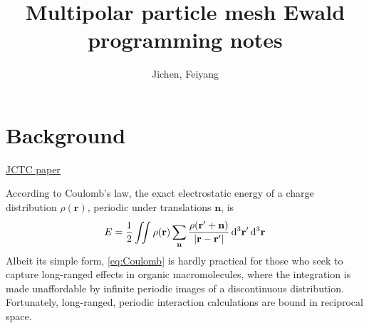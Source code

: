 \documentclass[12pt]{extarticle}
\title{Multipolar particle mesh Ewald programming notes}
\author{Jichen, Feiyang}
\renewcommand{\bf}{\mathbf}
\begin{document}
    \maketitle
    \section{Background}
    \href{https://pubs.acs.org/doi/pdf/10.1021/ct5007983}{JCTC paper}
    
    According to Coulomb's law, the exact electrostatic energy of a charge distribution \(\rho(\bf r)\), periodic under translations \(\bf n\), is  
    \begin{equation}
        E = \frac{1}{2} \iint \rho(\bf r) \sum_{\bf n} \frac{\rho \pqty{ \bf r' + \bf n}}{\abs{\bf r - \bf r'}} \dd[3]{\bf r'} \dd[3]{\bf r} \label{eq:Coulomb}
    \end{equation}
    Albeit its simple form, \cref{eq:Coulomb} is hardly practical for those who seek to capture long-ranged effects in organic macromolecules, where the integration is made unaffordable by infinite periodic images of a discontinuous distribution. Fortunately, long-ranged, periodic interaction calculations are bound in reciprocal space.
\end{document}
